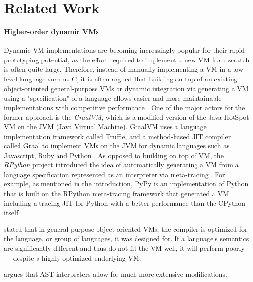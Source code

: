 
\section{Related Work}
\label{sec:related}

\paragraph{Higher-order dynamic VMs}
Dynamic VM implementations are becoming increasingly popular for their
rapid prototyping potential, as the effort required to implement a new
VM from scratch is often quite large. Therefore, instead of manually
implementing a VM in a low-level language such as C, it is often
argued that building on top of an existing object-oriented
general-purpose VMs or dynamic integration via generating a VM using a
"specification" of a language allows easier and more maintainable
implementations with competitive performance
\cite{bolz_how_no:07}. One of the major actors for the former approach
is the \emph{GraalVM}, which is a modified version of the Java HotSpot
VM on the JVM (Java Virtual Machine). GraalVM uses a language
implementation framework called Truffle, and a method-based JIT
compiler called Graal to implement VMs on the JVM for dynamic
languages such as Javascript, Ruby and Python \cite{graal:13}. As
opposed to building on top of VM, the \emph{RPython} project
introduced the idea of automatically generating a VM from a language
specification represented as an interpreter via meta-tracing
\cite{rpython07}. For example, as mentioned in the introduction, PyPy
is an implementation of Python that is built on the RPython
meta-tracing framework that generated a VM including a tracing JIT for
Python with a better performance than the CPython itself.





\cite{bolz15-meta-vm} stated that in general-purpose object-oriented
VMs, the compiler is optimized for the language, or group of
languages, it was designed for. If a language’s semantics are
significantly different and thus do not fit the VM well, it will
perform poorly— despite a highly optimized underlying VM.

\cite{ast:12} argues that AST interpreters allow for much more
extensive modifications.

